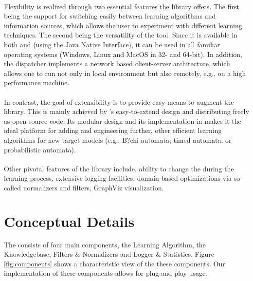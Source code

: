 	  \paragraph{}	
		Flexibility is realized through two essential features the library offers. The first being the support for switching easily between learning algorithms and information sources, which allows the user to experiment with different learning techniques. The second being the versatility of the tool. Since it is available in both \cpp and \java (using the Java Native Interface), it can be used in all familiar operating systems (Windows, Linux and MacOS in 32- and 64-bit). In addition, the dispatcher implements a network based client-server architecture, which allows one to run \libalf not only in local environment but also remotely, e.g., on a high performance machine.
		\paragraph{}
		In contrast, the goal of extensibility is to provide easy means to augment the library. This is mainly achieved by \libalf's easy-to-extend design and distributing \libalf freely as open source code. Its modular design and its implementation in \cpp makes it the ideal platform for adding and engineering further, other efficient learning algorithms for new target models (e.g., B?chi automata, timed automata, or probabilistic automata). 
		\paragraph{}
		Other pivotal features of the library include, ability to change the \alphsize during the learning process, extensive logging facilities, domain-based optimizations via so-called normalizers and filters, GraphViz visualization.
		
		
\section{Conceptual Details}

	The \libalf consists of four main components, the Learning Algorithm, the Knowledgebase, Filters \& Normalizers and Logger \& Statistics. Figure \ref{fig:components} shows a characteristic view of the these components. Our implementation of these components allows for plug and play usage.

